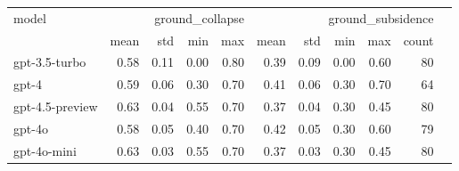 \begin{tabular}{lrrrrrrrrrr}
\toprule
model & \multicolumn{4}{r}{ground\_collapse} & \multicolumn{5}{r}{ground\_subsidence} \\
 & mean & std & min & max & mean & std & min & max & count \\
\midrule
gpt-3.5-turbo & 0.58 & 0.11 & 0.00 & 0.80 & 0.39 & 0.09 & 0.00 & 0.60 & 80 \\
gpt-4 & 0.59 & 0.06 & 0.30 & 0.70 & 0.41 & 0.06 & 0.30 & 0.70 & 64 \\
gpt-4.5-preview & 0.63 & 0.04 & 0.55 & 0.70 & 0.37 & 0.04 & 0.30 & 0.45 & 80 \\
gpt-4o & 0.58 & 0.05 & 0.40 & 0.70 & 0.42 & 0.05 & 0.30 & 0.60 & 79 \\
gpt-4o-mini & 0.63 & 0.03 & 0.55 & 0.70 & 0.37 & 0.03 & 0.30 & 0.45 & 80 \\
\bottomrule
\end{tabular}
